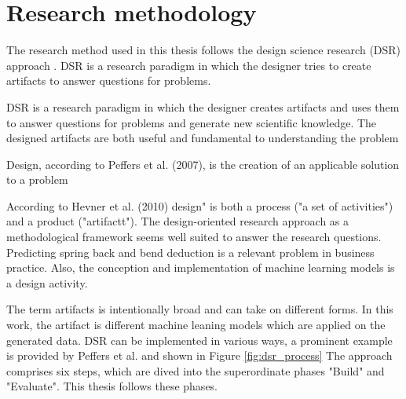 \chapter{Research methodology}\label{ch:research-methodology}

The research method used in this thesis follows the design science research (DSR) approach
\cite[p. 17]{rennenkampff_managementitagilitaetentwicklung_2015}.
DSR is a research paradigm in which the designer tries to create artifacts to answer questions
for problems.


DSR is a research paradigm in which the designer creates artifacts and uses them to answer
questions for problems and generate new scientific knowledge.
The designed artifacts are both useful and fundamental to understanding the problem \cite[p.
10]{hevner_designscienceresearch_2010}

Design, according to Peffers et al. (2007), is the creation of an applicable solution to a
problem \cite[p.47]{peffers_designscienceresearch_2007}

According to Hevner et al. (2010)
design" is both a process ("a set of activities") and a product ("artifactt"). \cite[p
.78]{hevner_designscienceresearch_2010}
The design-oriented research approach as a methodological framework seems well suited to answer
the research questions.
Predicting spring back and bend deduction is a relevant problem in business practice.
Also, the conception and implementation of machine learning models is a design activity.


The term artifacts is intentionally broad and can take on different forms. In this work, the
artifact is different machine leaning models which are applied on the generated data.
DSR can be implemented in various ways, a prominent example is provided by Peffers et al. and
shown in Figure \ref{fig:dsr_process}
The approach comprises six steps, which are dived into the superordinate phases "Build" and
"Evaluate". This thesis follows these phases.

